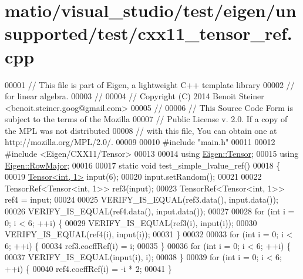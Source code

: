 \hypertarget{matio_2visual__studio_2test_2eigen_2unsupported_2test_2cxx11__tensor__ref_8cpp_source}{}\section{matio/visual\+\_\+studio/test/eigen/unsupported/test/cxx11\+\_\+tensor\+\_\+ref.cpp}
\label{matio_2visual__studio_2test_2eigen_2unsupported_2test_2cxx11__tensor__ref_8cpp_source}

\begin{DoxyCode}
00001 \textcolor{comment}{// This file is part of Eigen, a lightweight C++ template library}
00002 \textcolor{comment}{// for linear algebra.}
00003 \textcolor{comment}{//}
00004 \textcolor{comment}{// Copyright (C) 2014 Benoit Steiner <benoit.steiner.goog@gmail.com>}
00005 \textcolor{comment}{//}
00006 \textcolor{comment}{// This Source Code Form is subject to the terms of the Mozilla}
00007 \textcolor{comment}{// Public License v. 2.0. If a copy of the MPL was not distributed}
00008 \textcolor{comment}{// with this file, You can obtain one at http://mozilla.org/MPL/2.0/.}
00009 
00010 \textcolor{preprocessor}{#include "main.h"}
00011 
00012 \textcolor{preprocessor}{#include <Eigen/CXX11/Tensor>}
00013 
00014 \textcolor{keyword}{using} \hyperlink{class_eigen_1_1_tensor}{Eigen::Tensor};
00015 \textcolor{keyword}{using} \hyperlink{group__enums_ggaacded1a18ae58b0f554751f6cdf9eb13acfcde9cd8677c5f7caf6bd603666aae3}{Eigen::RowMajor};
00016 
00017 \textcolor{keyword}{static} \textcolor{keywordtype}{void} test\_simple\_lvalue\_ref()
00018 \{
00019   \hyperlink{class_eigen_1_1_tensor}{Tensor<int, 1>} input(6);
00020   input.setRandom();
00021 
00022   TensorRef<Tensor<int, 1>> ref3(input);
00023   TensorRef<Tensor<int, 1>> ref4 = input;
00024 
00025   VERIFY\_IS\_EQUAL(ref3.data(), input.data());
00026   VERIFY\_IS\_EQUAL(ref4.data(), input.data());
00027 
00028   \textcolor{keywordflow}{for} (\textcolor{keywordtype}{int} i = 0; i < 6; ++i) \{
00029     VERIFY\_IS\_EQUAL(ref3(i), input(i));
00030     VERIFY\_IS\_EQUAL(ref4(i), input(i));
00031   \}
00032 
00033   \textcolor{keywordflow}{for} (\textcolor{keywordtype}{int} i = 0; i < 6; ++i) \{
00034     ref3.coeffRef(i) = i;
00035   \}
00036   \textcolor{keywordflow}{for} (\textcolor{keywordtype}{int} i = 0; i < 6; ++i) \{
00037     VERIFY\_IS\_EQUAL(input(i), i);
00038   \}
00039   \textcolor{keywordflow}{for} (\textcolor{keywordtype}{int} i = 0; i < 6; ++i) \{
00040     ref4.coeffRef(i) = -i * 2;
00041   \}

\end{DoxyCode}
